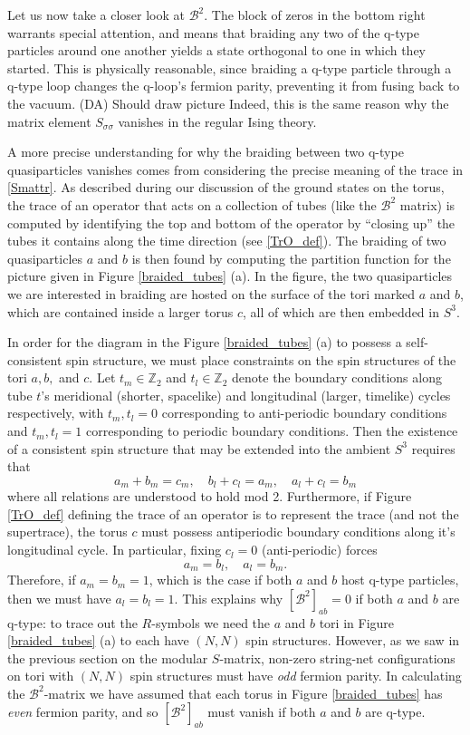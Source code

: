 \documentclass[12pt,a4paper]{article}
\newcommand{\zz}{\mathbb{Z}}
\newcommand{\mcb}{\mathcal{B}}
\newcommand\be            {\begin{equation}}
\newcommand\ee            {\end{equation}}
\newcommand{\dave}[1]{{\color{ao(english)}\footnotesize{(DA) #1}}}
\begin{document}
Let us now take a closer look at $\mcb^2$. 
The block of zeros in the bottom right warrants special attention, and means that braiding any two of the q-type particles around one another yields a state orthogonal to one in which they started. 
This is physically reasonable, since braiding a q-type particle through a q-type loop changes the q-loop's fermion parity, preventing it from fusing back to the vacuum. 
\dave{Should draw picture}
Indeed, this is the same reason why the matrix element $S_{\sigma\sigma}$ vanishes in the regular Ising theory. 

A more precise understanding for why the braiding between two q-type quasiparticles vanishes comes from considering the precise meaning of the trace in \eqref{Smattr}.
As described during our discussion of the ground states on the torus, the trace of an operator that acts on a collection of tubes (like the $\mcb^2$ matrix) is computed by identifying the top and bottom of the operator by ``closing up'' the tubes it contains along the time direction (see \eqref{TrO_def}).
The braiding of two quasiparticles $a$ and $b$ is then found by computing the partition function for the picture given in Figure \ref{braided_tubes} (a). 
In the figure, the two quasiparticles we are interested in braiding are hosted on the surface of the tori marked $a$ and $b$, which are contained inside a larger torus $c$, all of which are then embedded in $S^3$. 

In order for the diagram in the Figure \ref{braided_tubes} (a) to possess a self-consistent spin structure, we must place constraints on the spin structures of the tori $a,b,$ and $c$.
Let $t_m\in\zz_2$ and $t_l\in\zz_2$ denote the boundary conditions along tube $t$'s meridional (shorter, spacelike) and longitudinal (larger, timelike) cycles respectively, with $t_m,t_l=0$ corresponding to anti-periodic boundary conditions and $t_m,t_l=1$ corresponding to periodic boundary conditions.  
Then the existence of a consistent spin structure that may be extended into the ambient $S^3$ requires that 
\be a_m+b_m=c_m,\quad b_l+c_l=a_m,\quad a_l+c_l=b_m\ee
where all relations are understood to hold mod 2. 
Furthermore, if Figure \ref{TrO_def} defining the trace of an operator is to represent the trace (and not the supertrace), the torus $c$ must possess antiperiodic boundary conditions along it's longitudinal cycle. 
In particular, fixing $c_l=0$ (anti-periodic) forces 
\be a_m = b_l,\quad a_l=b_m.\ee
Therefore, if $a_m = b_m = 1$, which is the case if both $a$ and $b$ host q-type particles, then we must have $a_l = b_l = 1$. 
This explains why $[\mcb^2]_{ab}=0$ if both $a$ and $b$ are q-type: to trace out the $R$-symbols we need the $a$ and $b$ tori in Figure \ref{braided_tubes} (a) to each have $(N,N)$ spin structures. 
However, as we saw in the previous section on the modular $S$-matrix, non-zero string-net configurations on tori with $(N,N)$ spin structures must have {\it odd} fermion parity.
In calculating the $\mcb^2$-matrix we have assumed that each torus in Figure \ref{braided_tubes} has {\it even} fermion parity, and so $[\mcb^2]_{ab}$ must vanish if both $a$ and $b$ are q-type. 
\end{document}

